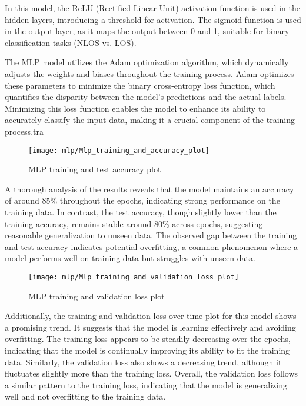 In this model, the ReLU (Rectified Linear Unit) activation function is used in the hidden layers, introducing a threshold for activation. The sigmoid function is used in the output layer, as it maps the output between 0 and 1, suitable for binary classification tasks (NLOS vs. LOS).

The MLP model utilizes the Adam optimization algorithm, which dynamically adjusts the weights and biases throughout the training process. Adam optimizes these parameters to minimize the binary cross-entropy loss function, which quantifies the disparity between the model's predictions and the actual labels. Minimizing this loss function enables the model to enhance its ability to accurately classify the input data, making it a crucial component of the training process.tra

\begin{figure}[H] 
	\centering
	\texttt{[image: mlp/Mlp\_training\_and\_accuracy\_plot]}
	\caption{MLP training and test accuracy plot}\label{fig:mlp_training_and_accuracy_plot}
\end{figure}

A thorough analysis of the results reveals that the model maintains an accuracy of around 85\% throughout the epochs, indicating strong performance on the training data. In contrast, the test accuracy, though slightly lower than the training accuracy, remains stable around 80\% across epochs, suggesting reasonable generalization to unseen data. The observed gap between the training and test accuracy indicates potential overfitting, a common phenomenon where a model performs well on training data but struggles with unseen data.

\begin{figure}[H] 
	\centering
	\texttt{[image: mlp/Mlp\_training\_and\_validation\_loss\_plot]}
	\caption{MLP training and validation loss plot}\label{fig:mlp_training_and_validation_loss_plot}
\end{figure}

Additionally, the training and validation loss over time plot for this model shows a promising trend. It suggests that the model is learning effectively and avoiding overfitting. The training loss appears to be steadily decreasing over the epochs, indicating that the model is continually improving its ability to fit the training data. Similarly, the validation loss also shows a decreasing trend, although it fluctuates slightly more than the training loss. Overall, the validation loss follows a similar pattern to the training loss, indicating that the model is generalizing well and not overfitting to the training data.

